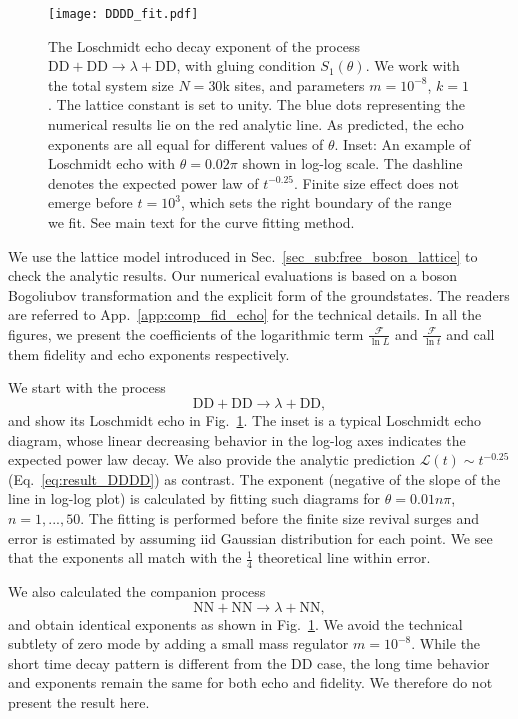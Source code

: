 \begin{figure}[h]
\texttt{[image: DDDD\_fit.pdf]}
\caption{The Loschmidt echo decay exponent of the process $\text{DD}+\text{DD}\rightarrow\lambda+\text{DD}$, with gluing condition $S_1(\theta)$. We work with the total system size $N = 30$k sites, and parameters $m = 10^{-8}$, $k = 1$. The lattice constant is set to unity. The blue dots representing the numerical results lie on the red analytic line. As predicted, the echo exponents are all equal for different values of $\theta$. Inset: An example of Loschmidt echo with $\theta = 0.02 \pi$ shown in log-log scale. The dashline denotes the expected power law of $t^{-0.25}$. Finite size effect does not emerge before $t=10^{3}$, which sets the right boundary of the range we fit. See main text for the curve fitting method.}
\label{fig:DDDD}
\end{figure}

We use the lattice model introduced in Sec.~\ref{sec_sub:free_boson_lattice} to check the analytic results. Our numerical evaluations is based on a boson Bogoliubov transformation and the explicit form of the groundstates. The readers are referred to App.~\ref{app:comp_fid_echo} for the technical details. In all the figures, we present the coefficients of the logarithmic term $\frac{\mathcal{F}}{\ln L}$ and $\frac{\mathcal{F} }{\ln t}$ and call them fidelity and echo exponents respectively. 

We start with the process
\begin{equation}
\text{DD}+\text{DD}\rightarrow\lambda+\text{DD},
\end{equation}
and show its Loschmidt echo in Fig.~\ref{fig:DDDD}. The inset is a typical Loschmidt echo diagram, whose linear decreasing behavior in the log-log axes indicates the expected power law decay. We also provide the analytic prediction $\mathcal{L}(t)\sim t^{-0.25}$ (\cf Eq.~\eqref{eq:result_DDDD}) as contrast. The exponent (negative of the slope of the line in log-log plot) is calculated by fitting such diagrams for $\theta = 0.01n \pi$, $n = 1,...,50 $. The fitting is performed before the finite size revival surges and error is estimated by assuming iid Gaussian distribution for each point. We see that the exponents all match with the $\frac{1}{4}$ theoretical line within error. 

We also calculated the companion process
\begin{equation}
 \text{NN}+\text{NN}\rightarrow\lambda+\text{NN},
\end{equation}
and obtain identical exponents as shown in Fig.~\ref{fig:DDDD}. We avoid the technical subtlety of zero mode by adding a small mass regulator $m=10^{-8}$. While the short time decay pattern is different from the DD case, the long time behavior and exponents remain the same for both echo and fidelity. We therefore do not present the result here. 

